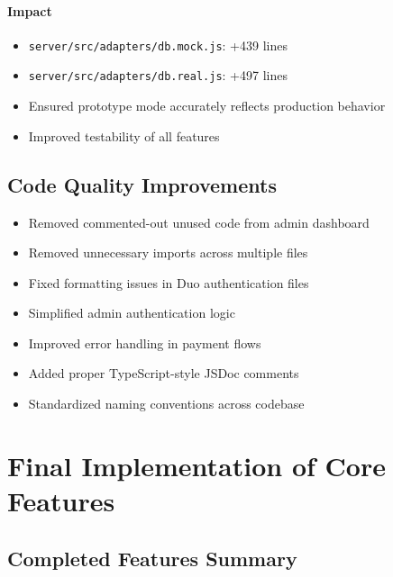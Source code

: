 \documentclass[11pt]{article}
\begin{document}
\paragraph{Impact}
\begin{itemize}[leftmargin=1.4em]
  \item \texttt{server/src/adapters/db.mock.js}: +439 lines
  \item \texttt{server/src/adapters/db.real.js}: +497 lines
  \item Ensured prototype mode accurately reflects production behavior
  \item Improved testability of all features
\end{itemize}

\subsection{Code Quality Improvements}
\begin{itemize}[leftmargin=1.4em]
  \item Removed commented-out unused code from admin dashboard
  \item Removed unnecessary imports across multiple files
  \item Fixed formatting issues in Duo authentication files
  \item Simplified admin authentication logic
  \item Improved error handling in payment flows
  \item Added proper TypeScript-style JSDoc comments
  \item Standardized naming conventions across codebase
\end{itemize}

\section{Final Implementation of Core Features}

\subsection{Completed Features Summary}
\end{document}
